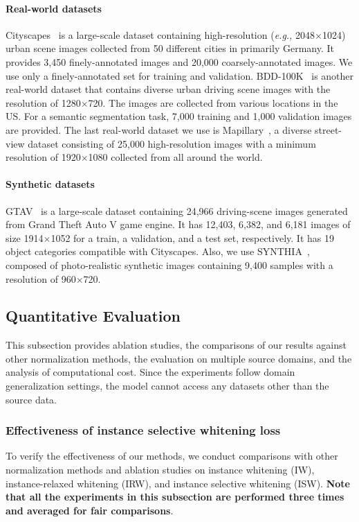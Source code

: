 \documentclass[final]{latex/cvpr}
\begin{document}
\paragraph{Real-world datasets} Cityscapes~\cite{Cordts2016Cityscapes} is a large-scale dataset containing high-resolution (\textit{e.g.,} 2048$\times$1024) urban scene images collected from 50 different cities in primarily Germany. It provides 3,450 finely-annotated images and 20,000 coarsely-annotated images. We use only a finely-annotated set for training and validation.
BDD-100K~\cite{yu2020bdd100k} is another real-world dataset that contains diverse urban driving scene images with the resolution of 1280$\times$720. The images are collected from various locations in the US. For a semantic segmentation task, 7,000 training and 1,000 validation images are provided.
The last real-world dataset we use is Mapillary~\cite{neuhold2017mapillary}, a diverse street-view dataset consisting of 25,000 high-resolution images with a minimum resolution of 1920$\times$1080 collected from all around the world.


\vspace{-0.48cm}
\paragraph{Synthetic datasets} GTAV~\cite{Richter_2016_ECCV} is a large-scale dataset containing 24,966 driving-scene images generated from Grand Theft Auto V game engine. It has 12,403, 6,382, and 6,181 images of size 1914$\times$1052 for a train, a validation, and a test set, respectively. It has 19 object categories compatible with Cityscapes.
Also, we use SYNTHIA~\cite{ros2016synthia}, composed of photo-realistic synthetic images containing 9,400 samples with a resolution of 960$\times$720. 


\vspace{-0.1cm}
\subsection{Quantitative Evaluation}
\vspace{-0.1cm}
This subsection provides ablation studies, the comparisons of our results against other normalization methods, the evaluation on multiple source domains, and the analysis of computational cost. Since the experiments follow domain generalization settings, the model cannot access any datasets other than the source data.
\vspace{-0.38cm}
\subsubsection{Effectiveness of instance selective whitening loss}\label{exp:effectiveness}
\vspace{-0.17cm}
To verify the effectiveness of our methods, we conduct comparisons with other normalization methods and ablation studies on instance whitening (IW), instance-relaxed whitening (IRW), and instance selective whitening (ISW).
\textbf{Note that all the experiments in this subsection are performed three times and averaged for fair comparisons}. 
\end{document}
